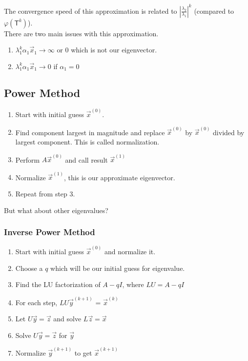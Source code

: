 \documentclass[12pt, letterpaper]{article}
\begin{document}
The convergence speed of this approximation is related to $\left|\frac{\lambda_2}{\lambda_1}\right|^k$ (compared to $\varphi(\textsf{T}^k)$). \\

\noindent There are two main issues with this approximation.
\begin{enumerate}
    \item $\lambda_1^k\alpha_1\vec x_1 \rightarrow \infty \text{ or } 0$ which is not our eigenvector.
    \item $\lambda_1^k\alpha_1\vec x_1 \rightarrow 0$ if $\alpha_1 = 0$ 
\end{enumerate}

\subsection{Power Method}
\begin{enumerate}
    \item Start with initial guess $\vec x^{(0)}$.
    \item Find component largest in magnitude and replace $\vec{x}^{(0)}$ by $\vec{x}^{(0)}$ 
            divided by largest component. This is called normalization.
    \item Perform $A\vec x^{(0)}$ and call result $\vec x ^{(1)}$
    \item Normalize $\vec x^{(1)}$, this is our approximate eigenvector.
    \item Repeat from step 3.
\end{enumerate}

\noindent But what about other eigenvalues?

\subsubsection{Inverse Power Method}

\begin{enumerate}
    \item Start with initial guess $\vec{x}^{(0)}$ and normalize it.
    \item Choose a $q$ which will be our initial guess for eigenvalue.
    \item Find the LU factorization of $A-qI$, where $LU=A-qI$
    \item For each step, $LU\vec{y}^{(k+1)}$ = $\vec x^{(k)}$
    \item Let $U\vec y = \vec z$ and solve $L\vec z = \vec x$
    \item Solve $U\vec y = \vec z$ for $\vec y$
    \item Normalize $\vec{y}^{(k+1)}$ to get $\vec x^{(k+1)}$
\end{enumerate}
\end{document}
